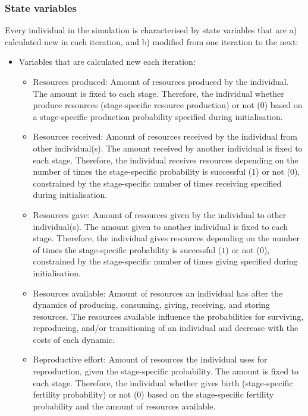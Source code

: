 \documentclass{article}
\begin{document}
\subsubsection{State variables}

Every individual in the simulation is characterised by state variables that are a) calculated new in each iteration, and b) modified from one iteration to the next:

\begin{itemize}
    \item Variables that are calculated new each iteration:
    \begin{itemize}
        \item Resources produced: Amount of resources produced by the individual. The amount is fixed to each stage. Therefore, the individual whether produce resources (stage-specific resource production) or not (0) based on a stage-specific production probability specified during initialisation.
        \item Resources received: Amount of resources received by the individual from other individual(s). The amount received by another individual is fixed to each stage. Therefore, the individual receives resources depending on the number of times the stage-specific probability is successful ($1$) or not ($0$), constrained by the stage-specific number of times receiving specified during initialisation.
        \item Resources gave: Amount of resources given by the individual to other individual(s). The amount given to another individual is fixed to each stage. Therefore, the individual gives resources depending on the number of times the stage-specific probability is successful ($1$) or not ($0$), constrained by the stage-specific number of times giving specified during initialisation.
        \item Resources available: Amount of resources an individual has after the dynamics of producing, consuming, giving, receiving, and storing resources. The resources available influence the probabilities for surviving, reproducing, and/or transitioning of an individual and decrease with the costs of each dynamic.
        \item Reproductive effort: Amount of resources the individual uses for reproduction, given the stage-specific probability. The amount is fixed to each stage. Therefore, the individual whether gives birth (stage-specific fertility probability)  or not (0) based on the stage-specific fertility probability and the amount of resources available.

\end{itemize}
\end{itemize}
\end{document}
